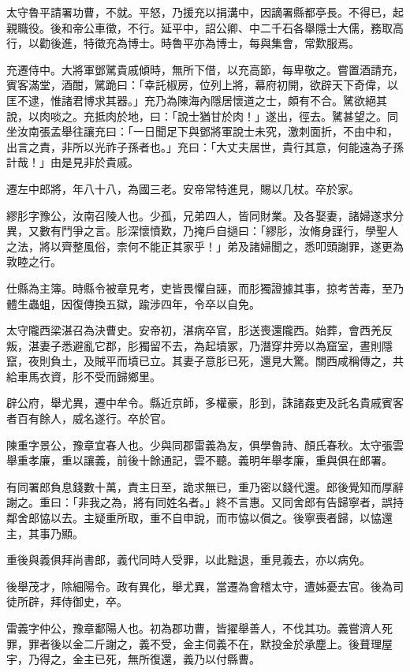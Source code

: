 \begin{pinyinscope}
太守魯平請署功曹，不就。平怒，乃援充以捐溝中，因謫署縣都亭長。不得已，起親職役。後和帝公車徵，不行。延平中，詔公卿、中二千石各舉隱士大儒，務取高行，以勸後進，特徵充為博士。時魯平亦為博士，每與集會，常歎服焉。

充遷侍中。大將軍鄧騭貴戚傾時，無所下借，以充高節，每卑敬之。嘗置酒請充，賓客滿堂，酒酣，騭跪曰：「幸託椒房，位列上將，幕府初開，欲辟天下奇偉，以匡不逮，惟諸君博求其器。」充乃為陳海內隱居懷道之士，頗有不合。騭欲絕其說，以肉啖之。充抵肉於地，曰：「說士猶甘於肉！」遂出，徑去。騭甚望之。同坐汝南張孟舉往讓充曰：「一日聞足下與鄧將軍說士未究，激刺面折，不由中和，出言之責，非所以光祚子孫者也。」充曰：「大丈夫居世，貴行其意，何能遠為子孫計哉！」由是見非於貴戚。

遷左中郎將，年八十八，為國三老。安帝常特進見，賜以几杖。卒於家。

繆肜字豫公，汝南召陵人也。少孤，兄弟四人，皆同財業。及各娶妻，諸婦遂求分異，又數有鬥爭之言。肜深懷憤歎，乃掩戶自撾曰：「繆肜，汝脩身謹行，學聖人之法，將以齊整風俗，柰何不能正其家乎！」弟及諸婦聞之，悉叩頭謝罪，遂更為敦睦之行。

仕縣為主簿。時縣令被章見考，吏皆畏懼自誣，而肜獨證據其事，掠考苦毒，至乃體生蟲蛆，因復傳換五獄，踰涉四年，令卒以自免。

太守隴西梁湛召為決曹史。安帝初，湛病卒官，肜送喪還隴西。始葬，會西羌反叛，湛妻子悉避亂它郡，肜獨留不去，為起墳冢，乃潛穿井旁以為窟室，晝則隱竄，夜則負土，及賊平而墳已立。其妻子意肜已死，還見大驚。關西咸稱傳之，共給車馬衣資，肜不受而歸鄉里。

辟公府，舉尤異，遷中牟令。縣近京師，多權豪，肜到，誅諸姦吏及託名貴戚賓客者百有餘人，威名遂行。卒於官。

陳重字景公，豫章宜春人也。少與同郡雷義為友，俱學魯詩、顏氏春秋。太守張雲舉重孝廉，重以讓義，前後十餘通記，雲不聽。義明年舉孝廉，重與俱在郎署。

有同署郎負息錢數十萬，責主日至，詭求無已，重乃密以錢代還。郎後覺知而厚辭謝之。重曰：「非我之為，將有同姓名者。」終不言惠。又同舍郎有告歸寧者，誤持鄰舍郎恊以去。主疑重所取，重不自申說，而巿恊以償之。後寧喪者歸，以恊還主，其事乃顯。

重後與義俱拜尚書郎，義代同時人受罪，以此黜退，重見義去，亦以病免。

後舉茂才，除細陽令。政有異化，舉尤異，當遷為會稽太守，遭姊憂去官。後為司徒所辟，拜侍御史，卒。

雷義字仲公，豫章鄱陽人也。初為郡功曹，皆擢舉善人，不伐其功。義嘗濟人死罪，罪者後以金二斤謝之，義不受，金主伺義不在，默投金於承塵上。後葺理屋宇，乃得之，金主已死，無所復還，義乃以付縣曹。


\end{pinyinscope}

